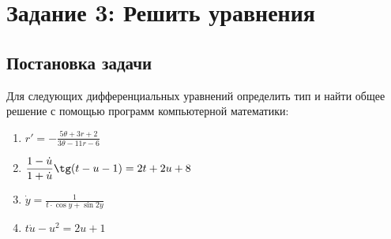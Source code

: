 \documentclass[14pt, a4paper, titlepage, fleqn]{extarticle}
\begin{document}
    \section{Задание 3: Решить уравнения}
        \subsection{Постановка задачи}
            Для следующих дифференциальных уравнений определить тип и найти
            общее решение с помощью программ компьютерной математики:
            \begin{enumerate}
                \item 
                \(
                    \displaystyle
                    r' = -\frac{5\theta + 3r + 2}{3\theta -11r-6}    
                \)

                \item 
                \(
                    \displaystyle
                    \frac{1-\dot{u}}{1+\dot{u}} \tg (t-u-1) = 2t+2u+8
                \)

                \item 
                \(
                    \displaystyle
                    \dot{y} = \frac{1}{t \cdot \cos{y} + \sin{2y}}
                \)
                
                \item 
                \(
                    \displaystyle
                    t\dot{u} - u^2=2u+1    
                \)
            \end{enumerate}
\end{document}
